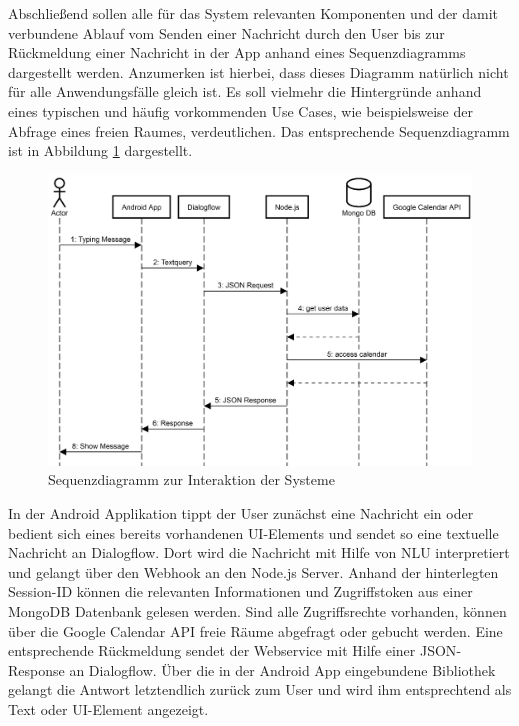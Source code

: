 Abschließend sollen alle für das System relevanten Komponenten und der damit verbundene Ablauf vom Senden einer Nachricht durch den User bis zur Rückmeldung einer Nachricht in der App anhand eines Sequenzdiagramms dargestellt werden. Anzumerken ist hierbei, dass dieses Diagramm natürlich nicht für alle Anwendungsfälle gleich ist. Es soll vielmehr die Hintergründe anhand eines typischen und häufig vorkommenden Use Cases, wie beispielsweise der Abfrage eines freien Raumes, verdeutlichen. Das entsprechende Sequenzdiagramm ist in Abbildung \ref{fig:sequence-diagramm-basic-system-interaction} dargestellt.
\newline

\begin{figure}[H]
    \centering
    \includegraphics[width=1\textwidth]{bilder/Basic-System-Interaction.png}
    \caption{Sequenzdiagramm zur Interaktion der Systeme}
    \label{fig:sequence-diagramm-basic-system-interaction}
\end{figure}

In der Android Applikation tippt der User zunächst eine Nachricht ein oder bedient sich eines bereits vorhandenen \ac{UI}-Elements und sendet so eine textuelle Nachricht an Dialogflow. Dort wird die Nachricht mit Hilfe von \acl{NLU} interpretiert und gelangt über den Webhook an den Node.js Server. Anhand der hinterlegten Session-\ac{ID} können die relevanten Informationen und Zugriffstoken aus einer MongoDB Datenbank gelesen werden. Sind alle Zugriffsrechte vorhanden, können über die Google Calendar \ac{API} freie Räume abgefragt oder gebucht werden. Eine entsprechende Rückmeldung sendet der Webservice mit Hilfe einer \ac{JSON}-Response an Dialogflow. Über die in der Android App eingebundene Bibliothek gelangt die Antwort letztendlich zurück zum User und wird ihm entsprechtend als Text oder \ac{UI}-Element angezeigt.

